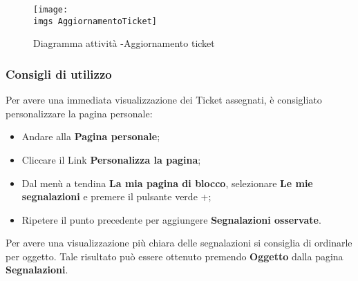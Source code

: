 \begin{figure}[H]
  \centering
    \texttt{[image: \\imgs AggiornamentoTicket]}
  \caption{Diagramma attività -Aggiornamento ticket}
  \label{fig:gull}
\end{figure}




\subsubsection{Consigli di utilizzo}
 
	Per avere una immediata visualizzazione dei Ticket assegnati, è consigliato personalizzare 
	la pagina personale: 
	\begin{itemize}
		\item Andare alla \textbf{Pagina personale}; 
		\item Cliccare il Link \textbf{Personalizza la pagina}; 
		\item Dal menù a tendina \textbf{La mia pagina di blocco}, selezionare \textbf{Le mie segnalazioni} 
		e premere il pulsante verde +; 
		\item Ripetere il punto precedente per aggiungere \textbf{Segnalazioni osservate}. 
	
	\end{itemize}

	Per avere una visualizzazione più chiara delle segnalazioni si consiglia di ordinarle per 
	oggetto. Tale risultato può essere ottenuto premendo \textbf{Oggetto} dalla pagina \textbf{Segnalazioni}.